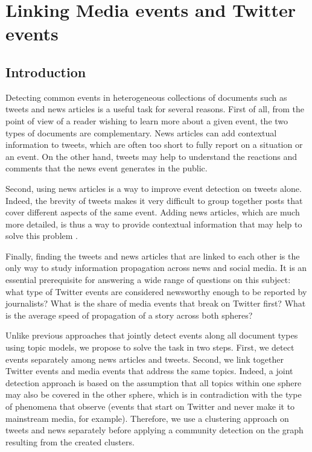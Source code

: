 \chapter{Linking Media events and Twitter events}
\label{Chap: Linking Media events and Twitter events}
\section{Introduction}

Detecting common events in heterogeneous collections of documents such as tweets and news articles is a useful task for several reasons. First of all, from the point of view of a reader wishing to learn more about a given event, the two types of documents are complementary. News articles can add contextual information to tweets, which are often too short to fully report on a situation or an event. On the other hand, tweets may help to understand the reactions and comments that the news event generates in the public. 

Second, using news articles is a way to improve event detection on tweets alone. Indeed, the brevity of tweets makes it very difficult to group together posts that cover different aspects 
of the same event. Adding news articles, which are much more detailed, is thus a way to provide contextual information that may help to solve this problem \citep{phan_2008_learning}.

Finally, finding the tweets and news articles that are linked to each other is the only way to study information propagation across news and social media. It is an essential prerequisite for answering a wide range of questions on this subject: what type of Twitter events are considered newsworthy enough to be reported by journalists? What is the share of media events that break on Twitter first? What is the average speed of propagation of a story across both spheres?

Unlike previous approaches that jointly detect events along all document types using topic models, we propose to solve the task in two steps. First, we detect events separately among news articles and tweets. Second, we link together Twitter events and media events that address the same topics. Indeed, a joint detection approach is based on the assumption that all topics within one sphere may also be covered in the other sphere, which is in contradiction with the type of phenomena that observe (events that start on Twitter and never make it to mainstream media, for example). Therefore, we use a clustering approach on tweets and news separately before applying a community detection on the graph resulting from the created clusters.

